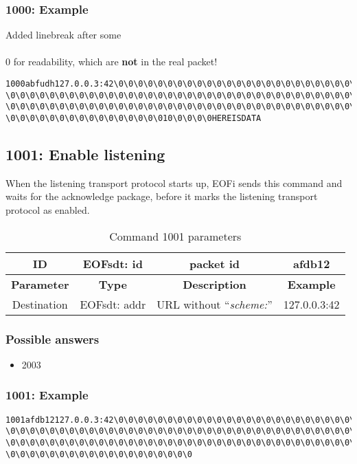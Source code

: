 \documentclass[12pt,a4paper]{book}
\begin{document}
\subsubsection{1000: Example}
Added linebreak after some \\\\0 for readability, which are \textbf{not} in
the real packet!
\begin{verbatim}
1000abfudh127.0.0.3:42\0\0\0\0\0\0\0\0\0\0\0\0\0\0\0\0\0\0\0\0\0\0\0\0\0\0\0\0
\0\0\0\0\0\0\0\0\0\0\0\0\0\0\0\0\0\0\0\0\0\0\0\0\0\0\0\0\0\0\0\0\0\0\0\0
\0\0\0\0\0\0\0\0\0\0\0\0\0\0\0\0\0\0\0\0\0\0\0\0\0\0\0\0\0\0\0\0\0\0\0\0
\0\0\0\0\0\0\0\0\0\0\0\0\0\0\0\010\0\0\0\0HEREISDATA
\end{verbatim}
\subsection{1001: Enable listening}
%
When the listening transport protocol starts up, EOFi sends this command and
waits for the acknowledge package, before it marks the listening
transport protocol as enabled.
\begin{longtable}{|c|c|c|c|}
\caption{Command 1001 parameters}\\
\hline
ID & EOFsdt: id & packet id & afdb12\\
\hline
\textbf{Parameter} & \textbf{Type} & \textbf{Description} & \textbf{Example}\\
\hline
Destination & EOFsdt: addr & URL without "`\emph{scheme:}"' & 127.0.0.3:42\\
\hline
\end{longtable}
\subsubsection{Possible answers}
\begin{itemize}
\item 2003
\end{itemize}
\subsubsection{1001: Example}
\begin{verbatim}
1001afdb12127.0.0.3:42\0\0\0\0\0\0\0\0\0\0\0\0\0\0\0\0\0\0\0\0\0\0\0\0\0
\0\0\0\0\0\0\0\0\0\0\0\0\0\0\0\0\0\0\0\0\0\0\0\0\0\0\0\0\0\0\0\0\0\0\0\0
\0\0\0\0\0\0\0\0\0\0\0\0\0\0\0\0\0\0\0\0\0\0\0\0\0\0\0\0\0\0\0\0\0\0\0\0
\0\0\0\0\0\0\0\0\0\0\0\0\0\0\0\0\0\0\0
\end{verbatim}
\end{document}
